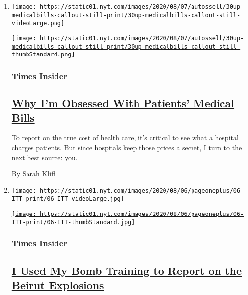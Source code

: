 \begin{enumerate}
\def\labelenumi{\arabic{enumi}.}
\item
  \texttt{[image: https://static01.nyt.com/images/2020/08/07/autossell/30up-medicalbills-callout-still-print/30up-medicalbills-callout-still-videoLarge.png]}

  \href{/2020/08/07/insider/coronavirus-medical-bills.html}{\texttt{[image: https://static01.nyt.com/images/2020/08/07/autossell/30up-medicalbills-callout-still-print/30up-medicalbills-callout-still-thumbStandard.png]}}

  \hypertarget{times-insider}{%
  \subsubsection{Times Insider}\label{times-insider}}

  \hypertarget{why-im-obsessed-with-patients-medical-bills}{%
  \subsection{\texorpdfstring{\href{/2020/08/07/insider/coronavirus-medical-bills.html}{Why
  I'm Obsessed With Patients' Medical
  Bills}}{Why I'm Obsessed With Patients' Medical Bills}}\label{why-im-obsessed-with-patients-medical-bills}}

  To report on the true cost of health care, it's critical to see what a
  hospital charges patients. But since hospitals keep those prices a
  secret, I turn to the next best source: you.

  By Sarah Kliff
\item
  \texttt{[image: https://static01.nyt.com/images/2020/08/06/pageoneplus/06-ITT-print/06-ITT-videoLarge.jpg]}

  \href{/2020/08/06/insider/bomb-training-beirut-explosions.html}{\texttt{[image: https://static01.nyt.com/images/2020/08/06/pageoneplus/06-ITT-print/06-ITT-thumbStandard.jpg]}}

  \hypertarget{times-insider-1}{%
  \subsubsection{Times Insider}\label{times-insider-1}}

  \hypertarget{i-used-my-bomb-training-to-report-on-the-beirut-explosions}{%
  \subsection{\texorpdfstring{\href{/2020/08/06/insider/bomb-training-beirut-explosions.html}{I
  Used My Bomb Training to Report on the Beirut
  Explosions}}{I Used My Bomb Training to Report on the Beirut Explosions}}\label{i-used-my-bomb-training-to-report-on-the-beirut-explosions}}


\end{enumerate}
